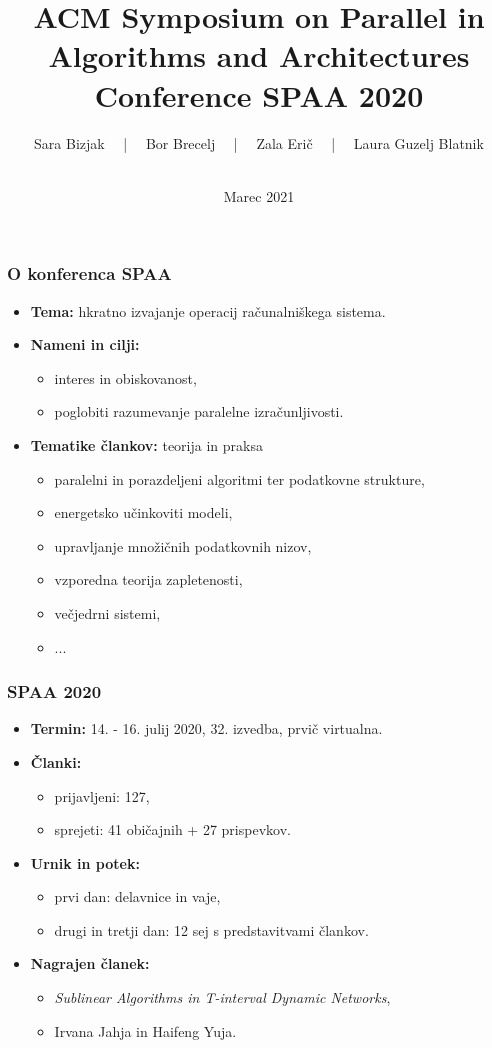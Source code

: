 \documentclass[a4paper, 12pt]{beamer}
\title[Seminar 1 -- SPAA 2020]{\textbf{ACM Symposium on Parallel in Algorithms and Architectures}
\\
Conference SPAA 2020
}
\author[FRI, Algoritmi]{Sara Bizjak  \ \ |  \ \ Bor Brecelj  \ \ |  \ \  Zala Erič  \ \ |  \ \  Laura Guzelj Blatnik
\\
\\
}
\institute[]{\small{Fakulteta za računalništvo in informatiko, 
\\
Univerza v Ljubljani}}
\date{Marec 2021}
\newcommand{\myitem}{\item[\textbullet]}
\theoremstyle{definition}
\theoremstyle{plain}
\begin{document}
\titlepage


\begin{frame}
\frametitle{O konferenca SPAA}

    \begin{itemize}
        \item \textbf{Tema:} hkratno izvajanje operacij računalniškega sistema.
        \item \textbf{Nameni in cilji:} 
        \begin{itemize}
            \myitem interes in obiskovanost,
            \myitem poglobiti razumevanje paralelne izračunljivosti.
        \end{itemize}
        \item \textbf{Tematike člankov:} teorija in praksa
        \begin{itemize}
            \myitem paralelni in porazdeljeni algoritmi ter podatkovne strukture,
            \myitem energetsko učinkoviti modeli,
            \myitem upravljanje množičnih podatkovnih nizov,
            \myitem vzporedna teorija zapletenosti,
            \myitem večjedrni sistemi,
            \myitem ...
        \end{itemize}
    \end{itemize}

\end{frame}


\begin{frame}
    \frametitle{SPAA 2020}
    
        \begin{itemize}
            \item \textbf{Termin:}
            14. - 16. julij 2020, 32. izvedba, prvič virtualna.
            \item \textbf{Članki:}
            \begin{itemize}
                \myitem prijavljeni: 127,
                \myitem sprejeti: 41 običajnih + 27 prispevkov.
            \end{itemize}
            \item \textbf{Urnik in potek:}
            \begin{itemize}
                \myitem prvi dan: delavnice in vaje,
                \myitem drugi in tretji dan: 12 sej s predstavitvami člankov.
            \end{itemize}
            \item \textbf{Nagrajen članek:} 
            \begin{itemize}
                \item \textit{Sublinear Algorithms in T-interval Dynamic Networks}, 
                \item Irvana Jahja in Haifeng Yuja.
            \end{itemize}
        \end{itemize}
    
    \end{frame}
\end{document}

